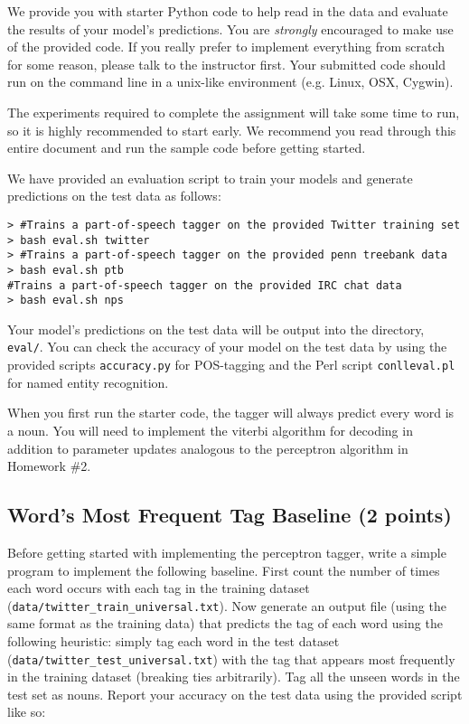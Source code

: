 \documentclass[12pt, letterpaper]{article}
\begin{document}
We provide you with starter Python code to help read in the data and evaluate the results of your model's predictions.
You are \emph{strongly} encouraged to make use of the provided code.  
If you really prefer to implement everything from scratch for some reason, please talk to the instructor first.  Your submitted code
should run on the command line in a unix-like environment (e.g. Linux, OSX, Cygwin).

The experiments required to complete the assignment will take some
time to run, so it is highly recommended to start early.  We recommend you read through this entire document and
run the sample code before getting started.

We have provided an evaluation script to train your models and generate predictions on the test data as follows:
\begin{small}
\begin{verbatim}
> #Trains a part-of-speech tagger on the provided Twitter training set
> bash eval.sh twitter
> #Trains a part-of-speech tagger on the provided penn treebank data
> bash eval.sh ptb       
#Trains a part-of-speech tagger on the provided IRC chat data
> bash eval.sh nps          
\end{verbatim}
\end{small}

Your model's predictions on the test data will be output into the directory, {\tt eval/}.
You can check the accuracy of your model on the test data by using the provided scripts
{\tt accuracy.py} for POS-tagging and the Perl script {\tt conlleval.pl} for named entity
recognition.

When you first run the starter code, the tagger will always predict every word is a noun.  You will need to
implement the viterbi algorithm for decoding in addition to parameter updates analogous to the
perceptron algorithm in Homework \#2. 

\subsection*{Word's Most Frequent Tag Baseline (2 points)}
Before getting started with implementing the perceptron tagger, write a simple program to implement the following baseline.
First count the number of times each word occurs with each tag in the training dataset ({\tt data/twitter\_train\_universal.txt}).
Now generate an output file (using the same format as the training data) that predicts the tag of each word using the
following heuristic: simply tag each word in the test dataset ({\tt data/twitter\_test\_universal.txt}) with the tag that appears most frequently in the
training dataset (breaking ties arbitrarily).  Tag all the unseen words in the test set as nouns.
Report your accuracy on the test data using the provided script like so:
\end{document}
